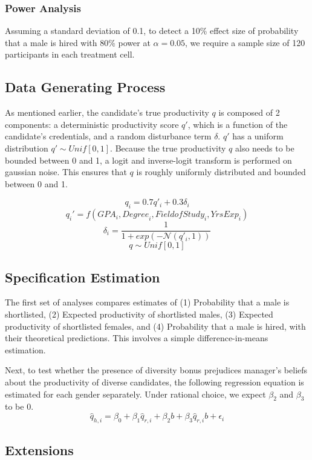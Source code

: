 \documentclass[11pt]{article}
\newcommand{\Unif}{\textit{Unif}[0,1]}
\begin{document}
\subsubsection*{Power Analysis}
Assuming a standard deviation of 0.1, to detect a 10\% effect size of probability that a male is hired with 80\% power at $\alpha=0.05$, we require a sample size of 120 participants in each treatment cell.

\subsection{Data Generating Process}

As mentioned earlier, the candidate's true productivity $q$ is composed of 2 components: a deterministic productivity score $q'$, which is a function of the candidate's credentials, and a random disturbance term $\delta$. $q'$ has a uniform distribution $q' \sim \Unif$. Because the true productivity $q$ also needs to be bounded between 0 and 1, a logit and inverse-logit transform is performed on gaussian noise. This ensures that $q$ is roughly uniformly distributed and bounded between 0 and 1.

$$q_i        = 0.7q'_i + 0.3\delta_i$$
$$q_i'= f(\textit{GPA}_i, \textit{Degree}_i, \textit{FieldofStudy}_i, \textit{YrsExp}_i)$$
$$\delta_i = \frac{1}{1+ exp(-\mathcal{N}(q'_i, 1))}$$
$$q \sim \Unif$$

\subsection{Specification Estimation}

The first set of analyses compares estimates of (1) Probability that a male is shortlisted, (2) Expected productivity of shortlisted males, (3) Expected productivity of shortlisted females, and (4) Probability that a male is hired, with their theoretical predictions. This involves a simple difference-in-means estimation.

Next, to test whether the presence of diversity bonus prejudices manager's beliefs about the productivity of diverse candidates, the following regression equation is estimated for each gender separately. Under rational choice, we expect $\beta_2$ and $\beta_3$ to be 0.
$$\hat{q}_{h,i} = \beta_0 + \beta_1 \hat{q}_{r,i} + \beta_2 b + \beta_3 \hat{q}_{r,i} b + \epsilon_i$$

\subsection{Extensions}
\end{document}
